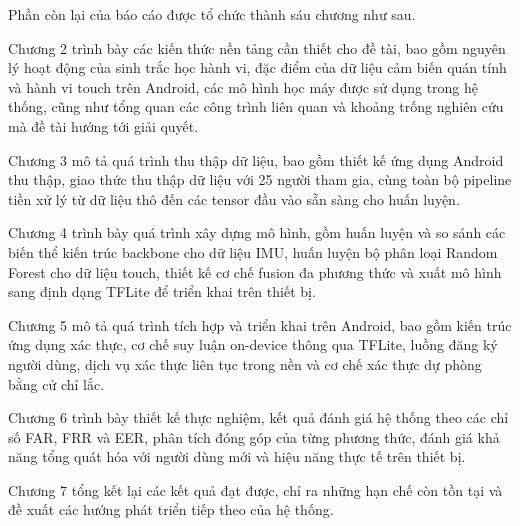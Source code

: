 \documentclass[../DoAn.tex]{subfiles}
\begin{document}
    Phần còn lại của báo cáo được tổ chức thành sáu chương như sau.

    Chương 2 trình bày các kiến thức nền tảng cần thiết cho đề tài, bao gồm nguyên lý hoạt động của sinh trắc học hành vi, đặc điểm của dữ liệu cảm biến quán tính và hành vi touch trên Android, các mô hình học máy được sử dụng trong hệ thống, cũng như tổng quan các công trình liên quan và khoảng trống nghiên cứu mà đề tài hướng tới giải quyết.

    Chương 3 mô tả quá trình thu thập dữ liệu, bao gồm thiết kế ứng dụng Android thu thập, giao thức thu thập dữ liệu với 25 người tham gia, cùng toàn bộ pipeline tiền xử lý từ dữ liệu thô đến các tensor đầu vào sẵn sàng cho huấn luyện.

    Chương 4 trình bày quá trình xây dựng mô hình, gồm huấn luyện và so sánh các biến thể kiến trúc backbone cho dữ liệu IMU, huấn luyện bộ phân loại Random Forest cho dữ liệu touch, thiết kế cơ chế fusion đa phương thức và xuất mô hình sang định dạng TFLite để triển khai trên thiết bị.

    Chương 5 mô tả quá trình tích hợp và triển khai trên Android, bao gồm kiến trúc ứng dụng xác thực, cơ chế suy luận on-device thông qua TFLite, luồng đăng ký người dùng, dịch vụ xác thực liên tục trong nền và cơ chế xác thực dự phòng bằng cử chỉ lắc.

    Chương 6 trình bày thiết kế thực nghiệm, kết quả đánh giá hệ thống theo các chỉ số FAR, FRR và EER, phân tích đóng góp của từng phương thức, đánh giá khả năng tổng quát hóa với người dùng mới và hiệu năng thực tế trên thiết bị.

    Chương 7 tổng kết lại các kết quả đạt được, chỉ ra những hạn chế còn tồn tại và đề xuất các hướng phát triển tiếp theo của hệ thống.
\end{document}
